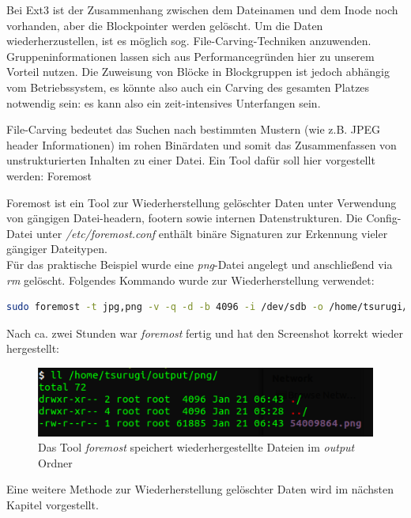 Bei Ext3 ist der Zusammenhang zwischen dem Dateinamen und dem Inode noch vorhanden, aber die Blockpointer werden gelöscht. Um die Daten wiederherzustellen, ist es möglich  sog. File-Carving-Techniken anzuwenden. Gruppeninformationen lassen sich aus Performancegründen hier zu unserem Vorteil nutzen. Die Zuweisung von Blöcke in Blockgruppen ist jedoch abhängig vom Betriebssystem, es könnte also auch ein Carving des gesamten Platzes notwendig sein: es kann also ein zeit-intensives Unterfangen sein.

File-Carving bedeutet das Suchen nach bestimmten Mustern (wie z.B. JPEG header Informationen) im rohen Binärdaten und somit das Zusammenfassen von unstrukturierten Inhalten zu einer Datei.
Ein Tool dafür soll hier vorgestellt werden: Foremost \cite{Foremost.07.01.2022}

Foremost ist ein Tool zur Wiederherstellung gelöschter Daten unter Verwendung von gängigen Datei-headern, footern sowie internen Datenstrukturen. Die Config-Datei unter \textit{/etc/foremost.conf} enthält binäre Signaturen zur Erkennung vieler gängiger Dateitypen.\\

Für das praktische Beispiel wurde eine \textit{png}-Datei angelegt und anschließend via \textit{rm} gelöscht. Folgendes Kommando wurde zur Wiederherstellung verwendet:

\begin{lstlisting}[language=bash]
sudo foremost -t jpg,png -v -q -d -b 4096 -i /dev/sdb -o /home/tsurugi/output
\end{lstlisting}

Nach ca. zwei Stunden war \textit{foremost} fertig und hat den Screenshot korrekt wieder hergestellt:

\begin{figure}[H]
	\centering
	\includegraphics[width=12cm,keepaspectratio=true]{pictures/foremostsuccess.png}
	\caption{
		Das Tool \textit{foremost} speichert wiederhergestellte Dateien im \textit{output} Ordner
	}
	\label{fig:foremostsuccess}
\end{figure}

Eine weitere Methode zur Wiederherstellung gelöschter Daten wird im nächsten Kapitel vorgestellt.

